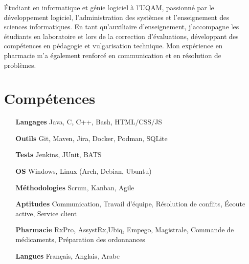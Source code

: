 \documentclass[letterpaper,10pt]{article}
\begin{document}


  Étudiant en informatique et génie logiciel à l’UQAM, passionné par le développement logiciel, l’administration des systèmes et l'enseignement des sciences informatiques. En tant qu’auxiliaire d’enseignement, j’accompagne les étudiants en laboratoire et lors de la correction d’évaluations, développant des compétences en pédagogie et vulgarisation technique. Mon expérience en pharmacie m’a également renforcé en communication et en résolution de problèmes.


  \section{Compétences}

  \begin{multicols}{2}
    \begin{itemize}[itemsep=-2px, parsep=5pt, leftmargin=75pt]
      \item[\textbf{Langages}] Java, C, C++, Bash, HTML/CSS/JS
      \item[\textbf{Outils}] Git, Maven, Jira, Docker, Podman, SQLite
      \item[\textbf{Tests}] Jenkins, JUnit, BATS
      \item[\textbf{OS}]  Windows, Linux (Arch, Debian, Ubuntu)
      \item[\textbf{Méthodologies}]  Scrum, Kanban, Agile
      \item[\textbf{Aptitudes}]  Communication, Travail d'équipe, Résolution de conflits, Écoute active, Service client
      \item[\textbf{Pharmacie}]  RxPro, AssystRx,Ubiq, Empego, Magistrale, Commande de médicaments, Préparation des ordonnances
      \item[\textbf{Langues}]  Français, Anglais, Arabe
    \end{itemize}
  \end{multicols}
\end{document}
